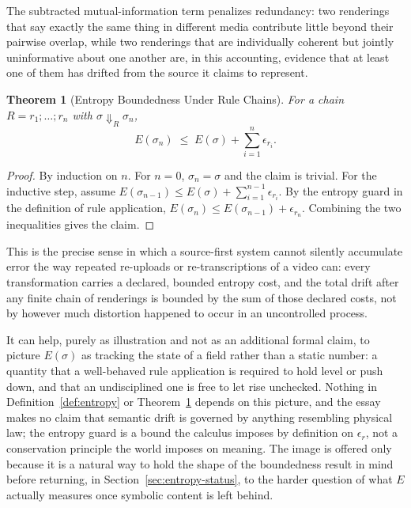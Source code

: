 \documentclass[11pt]{article}
\newtheorem{theorem}{Theorem}[section]
\theoremstyle{definition}
\begin{document}
The subtracted mutual-information term penalizes redundancy: two renderings that say exactly the same thing in different media contribute little beyond their pairwise overlap, while two renderings that are individually coherent but jointly uninformative about one another are, in this accounting, evidence that at least one of them has drifted from the source it claims to represent.

\begin{theorem}[Entropy Boundedness Under Rule Chains]
\label{thm:entropy-bound}
For a chain $R = r_1;\dots;r_n$ with $\sigma \Downarrow_R \sigma_n$,
\[
E(\sigma_n) \;\leq\; E(\sigma) + \sum_{i=1}^n \epsilon_{r_i}.
\]
\end{theorem}

\begin{proof}
By induction on $n$. For $n=0$, $\sigma_n = \sigma$ and the claim is trivial. For the inductive step, assume $E(\sigma_{n-1}) \leq E(\sigma) + \sum_{i=1}^{n-1}\epsilon_{r_i}$. By the entropy guard in the definition of rule application, $E(\sigma_n) \leq E(\sigma_{n-1}) + \epsilon_{r_n}$. Combining the two inequalities gives the claim.
\end{proof}

This is the precise sense in which a source-first system cannot silently accumulate error the way repeated re-uploads or re-transcriptions of a video can: every transformation carries a declared, bounded entropy cost, and the total drift after any finite chain of renderings is bounded by the sum of those declared costs, not by however much distortion happened to occur in an uncontrolled process.

It can help, purely as illustration and not as an additional formal claim, to picture $E(\sigma)$ as tracking the state of a field rather than a static number: a quantity that a well-behaved rule application is required to hold level or push down, and that an undisciplined one is free to let rise unchecked. Nothing in Definition~\ref{def:entropy} or Theorem~\ref{thm:entropy-bound} depends on this picture, and the essay makes no claim that semantic drift is governed by anything resembling physical law; the entropy guard is a bound the calculus imposes by definition on $\epsilon_r$, not a conservation principle the world imposes on meaning. The image is offered only because it is a natural way to hold the shape of the boundedness result in mind before returning, in Section~\ref{sec:entropy-status}, to the harder question of what $E$ actually measures once symbolic content is left behind.
\end{document}
